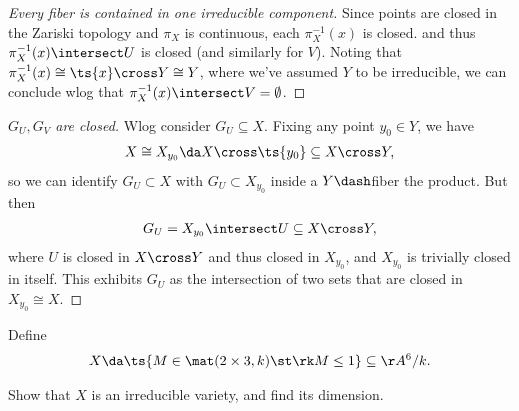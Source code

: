 \begin{solution}
\begin{proof}[Every fiber is contained in one irreducible component]
Since points are closed in the Zariski topology and \(\pi_X\) is
continuous, each \(\pi_X^{-1}(x)\) is closed. and thus
\(\pi_X^{-1}(x)\intersect U\) is closed (and similarly for \(V\)).
Noting that \(\pi_X^{-1}(x) \cong \ts{x}\cross Y \cong Y\), where we've
assumed \(Y\) to be irreducible, we can conclude wlog that
\(\pi_X^{-1}(x) \intersect V = \emptyset\).

\end{proof}

\begin{proof}[$G_U, G_V$ are closed]

Wlog consider \(G_U \subseteq X\). Fixing any point \(y_0 \in Y\), we
have
\begin{align*}X\cong X_{y_0} \da X\cross \ts{y_0} \subseteq X\cross Y,\end{align*}
so we can identify \(G_U \subset X\) with \(G_U\subset X_{y_0}\) inside
a \(Y\dash\)fiber the product. But then
\begin{align*}G_U = X_{y_0} \intersect U \subseteq X\cross Y,\end{align*}
where \(U\) is closed in \(X\cross Y\) and thus closed in \(X_{y_0}\),
and \(X_{y_0}\) is trivially closed in itself. This exhibits \(G_U\) as
the intersection of two sets that are closed in \(X_{y_0} \cong X\).

\end{proof}

\end{solution}

\begin{exercise}[Gathmann 2.33]

Define
\begin{align*}  
X \da \ts{M \in \mat(2\times 3, k) \st \rk M \leq 1} \subseteq \AA^6/k
.\end{align*}

Show that \(X\) is an irreducible variety, and find its dimension.

\end{exercise}

